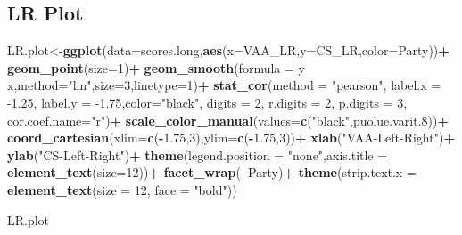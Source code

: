 \documentclass[
]{article}
\newenvironment{Shaded}{\begin{snugshade}}{\end{snugshade}}
\newcommand{\DataTypeTok}[1]{\textcolor[rgb]{0.13,0.29,0.53}{#1}}
\newcommand{\DecValTok}[1]{\textcolor[rgb]{0.00,0.00,0.81}{#1}}
\newcommand{\FloatTok}[1]{\textcolor[rgb]{0.00,0.00,0.81}{#1}}
\newcommand{\KeywordTok}[1]{\textcolor[rgb]{0.13,0.29,0.53}{\textbf{#1}}}
\newcommand{\NormalTok}[1]{#1}
\newcommand{\OperatorTok}[1]{\textcolor[rgb]{0.81,0.36,0.00}{\textbf{#1}}}
\newcommand{\StringTok}[1]{\textcolor[rgb]{0.31,0.60,0.02}{#1}}
\begin{document}
\newpage

\hypertarget{lr-plot}{%
\subsection{LR Plot}\label{lr-plot}}

\begin{Shaded}
\begin{Highlighting}[]
\NormalTok{LR.plot<-}\KeywordTok{ggplot}\NormalTok{(}\DataTypeTok{data=}\NormalTok{scores.long,}\KeywordTok{aes}\NormalTok{(}\DataTypeTok{x=}\NormalTok{VAA_LR,}\DataTypeTok{y=}\NormalTok{CS_LR,}\DataTypeTok{color=}\NormalTok{Party))}\OperatorTok{+}
\StringTok{  }\KeywordTok{geom_point}\NormalTok{(}\DataTypeTok{size=}\DecValTok{1}\NormalTok{)}\OperatorTok{+}
\StringTok{  }\KeywordTok{geom_smooth}\NormalTok{(}\DataTypeTok{formula =}\NormalTok{ y }\OperatorTok{~}\StringTok{ }\NormalTok{x,}\DataTypeTok{method=}\StringTok{"lm"}\NormalTok{,}\DataTypeTok{size=}\DecValTok{3}\NormalTok{,}\DataTypeTok{linetype=}\DecValTok{1}\NormalTok{)}\OperatorTok{+}
\StringTok{  }\KeywordTok{stat_cor}\NormalTok{(}\DataTypeTok{method =} \StringTok{"pearson"}\NormalTok{, }\DataTypeTok{label.x =} \FloatTok{-1.25}\NormalTok{, }\DataTypeTok{label.y =} \FloatTok{-1.75}\NormalTok{,}\DataTypeTok{color=}\StringTok{"black"}\NormalTok{,}
           \DataTypeTok{digits =} \DecValTok{2}\NormalTok{,}
           \DataTypeTok{r.digits =} \DecValTok{2}\NormalTok{,}
           \DataTypeTok{p.digits =} \DecValTok{3}\NormalTok{,}
           \DataTypeTok{cor.coef.name=}\StringTok{"r"}\NormalTok{)}\OperatorTok{+}
\StringTok{  }\KeywordTok{scale_color_manual}\NormalTok{(}\DataTypeTok{values=}\KeywordTok{c}\NormalTok{(}\StringTok{"black"}\NormalTok{,puolue.varit}\FloatTok{.8}\NormalTok{))}\OperatorTok{+}
\StringTok{  }\KeywordTok{coord_cartesian}\NormalTok{(}\DataTypeTok{xlim=}\KeywordTok{c}\NormalTok{(}\OperatorTok{-}\FloatTok{1.75}\NormalTok{,}\DecValTok{3}\NormalTok{),}\DataTypeTok{ylim=}\KeywordTok{c}\NormalTok{(}\OperatorTok{-}\FloatTok{1.75}\NormalTok{,}\DecValTok{3}\NormalTok{))}\OperatorTok{+}
\StringTok{  }\KeywordTok{xlab}\NormalTok{(}\StringTok{"VAA-Left-Right"}\NormalTok{)}\OperatorTok{+}
\StringTok{  }\KeywordTok{ylab}\NormalTok{(}\StringTok{"CS-Left-Right"}\NormalTok{)}\OperatorTok{+}
\StringTok{  }\KeywordTok{theme}\NormalTok{(}\DataTypeTok{legend.position =} \StringTok{"none"}\NormalTok{,}\DataTypeTok{axis.title =} \KeywordTok{element_text}\NormalTok{(}\DataTypeTok{size=}\DecValTok{12}\NormalTok{))}\OperatorTok{+}
\StringTok{  }\KeywordTok{facet_wrap}\NormalTok{(}\OperatorTok{~}\NormalTok{Party)}\OperatorTok{+}
\StringTok{  }\KeywordTok{theme}\NormalTok{(}\DataTypeTok{strip.text.x =} 
          \KeywordTok{element_text}\NormalTok{(}\DataTypeTok{size =} \DecValTok{12}\NormalTok{, }\DataTypeTok{face =} \StringTok{"bold"}\NormalTok{))}

\NormalTok{LR.plot}
\end{Highlighting}
\end{Shaded}
\end{document}
